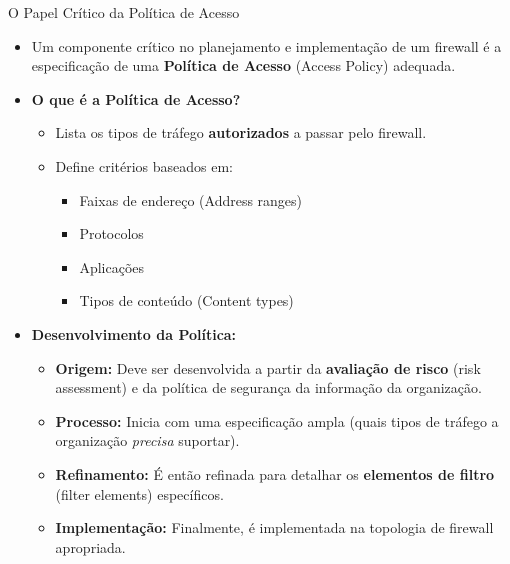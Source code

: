 \begin{frame}{O Papel Crítico da Política de Acesso}
    \begin{itemize}
        \item Um componente crítico no planejamento e implementação de um firewall é a especificação de uma \textbf{Política de Acesso} (Access Policy) adequada.

        \item \textbf{O que é a Política de Acesso?}
              \begin{itemize}
                  \item Lista os tipos de tráfego \textbf{autorizados} a passar pelo firewall.
                  \item Define critérios baseados em:
                        \begin{itemize}
                            \item Faixas de endereço (Address ranges)
                            \item Protocolos
                            \item Aplicações
                            \item Tipos de conteúdo (Content types)
                        \end{itemize}
              \end{itemize}

        \item \textbf{Desenvolvimento da Política:}
              \begin{itemize}
                  \item \textbf{Origem:} Deve ser desenvolvida a partir da \textbf{avaliação de risco} (risk assessment) e da política de segurança da informação da organização.
                  \item \textbf{Processo:} Inicia com uma especificação ampla (quais tipos de tráfego a organização \textit{precisa} suportar).
                  \item \textbf{Refinamento:} É então refinada para detalhar os \textbf{elementos de filtro} (filter elements) específicos.
                  \item \textbf{Implementação:} Finalmente, é implementada na topologia de firewall apropriada.
              \end{itemize}
    \end{itemize}
\end{frame}

